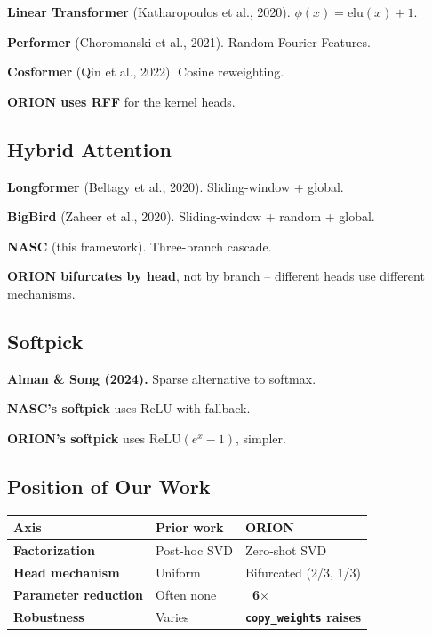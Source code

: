 \textbf{Linear Transformer} (Katharopoulos et al., 2020). $\phi(x) = \text{elu}(x) + 1$.

\textbf{Performer} (Choromanski et al., 2021). Random Fourier Features.

\textbf{Cosformer} (Qin et al., 2022). Cosine reweighting.

\textbf{ORION uses RFF} for the kernel heads.

\subsection{Hybrid Attention}

\textbf{Longformer} (Beltagy et al., 2020). Sliding-window + global.

\textbf{BigBird} (Zaheer et al., 2020). Sliding-window + random + global.

\textbf{NASC} (this framework). Three-branch cascade.

\textbf{ORION bifurcates by head}, not by branch -- different heads use different 
mechanisms.

\subsection{Softpick}

\textbf{Alman \& Song (2024).} Sparse alternative to softmax.

\textbf{NASC's softpick} uses ReLU with fallback.

\textbf{ORION's softpick} uses $\text{ReLU}(e^x - 1)$, simpler.

\subsection{Position of Our Work}

\begin{table}[H]
\centering
\small
\begin{tabular}{lll}
\toprule
\textbf{Axis} & \textbf{Prior work} & \textbf{ORION} \\
\midrule
\textbf{Factorization} & Post-hoc SVD & Zero-shot SVD \\
\textbf{Head mechanism} & Uniform & Bifurcated (2/3, 1/3) \\
\textbf{Parameter reduction} & Often none & \textbf{~6$\times$} \\
\textbf{Robustness} & Varies & \textbf{\texttt{copy\_weights} raises} \\
\bottomrule
\end{tabular}
\end{table}

